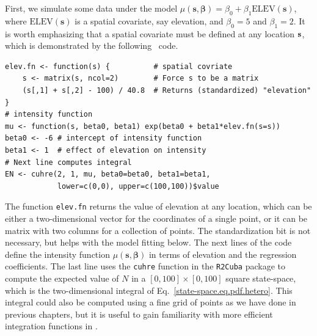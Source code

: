 First, we simulate some data under the model $\mu(\mathbf{s},
\bm{\beta}) = \beta_0 + \beta_1\mathrm{ELEV}(\mathbf{s})$, where
$\mathrm{ELEV}(\mathbf{s})$ is a spatial covariate, say
elevation, and $\beta_0=5$ and $\beta_1=2$. It is worth emphasizing
that a spatial covariate must be defined at any location $\bf s$,
which is demonstrated by the following \R~code.
  \begin{small}
\begin{verbatim}
elev.fn <- function(s) {          # spatial covriate
    s <- matrix(s, ncol=2)        # Force s to be a matrix
    (s[,1] + s[,2] - 100) / 40.8  # Returns (standardized) "elevation"
}
# intensity function
mu <- function(s, beta0, beta1) exp(beta0 + beta1*elev.fn(s=s))
beta0 <- -6 # intercept of intensity function
beta1 <- 1  # effect of elevation on intensity
# Next line computes integral
EN <- cuhre(2, 1, mu, beta0=beta0, beta1=beta1,
            lower=c(0,0), upper=c(100,100))$value
\end{verbatim}
  \end{small}
The function \texttt{elev.fn} returns the value of elevation at any
location, which can be either a two-dimensional vector for the
coordinates of a single point, or it can be matrix with two columns
for a collection of points. The standardization bit is not necessary,
but helps with the model fitting below. The next lines of the code define the
intensity function $\mu(\mathbf{s}, \bm{\beta})$ in terms of elevation
and the regression coefficients. The last line uses the \verb+cuhre+ function in
the {\tt R2Cuba} package \citep{hahn_etal:2011} to compute the
expected value of $N$ in a $[0,100]\times[0,100]$ square state-space, which is the
two-dimensional integral of Eq.~\ref{state-space.eq.pdf.hetero}. This
integral could also be computed using a fine grid of points as we have done in previous
chapters, but it is useful to gain familiarity with more efficient
integration functions in \R.


